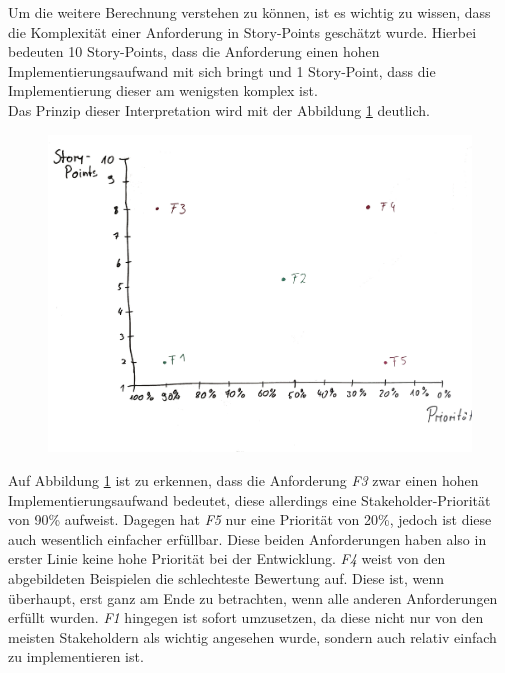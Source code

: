 Um die weitere Berechnung verstehen zu können, ist es wichtig zu wissen, dass die Komplexität einer Anforderung in Story-Points geschätzt wurde. Hierbei bedeuten 10 Story-Points, dass die Anforderung einen hohen Implementierungsaufwand mit sich bringt und 1 Story-Point, dass die Implementierung dieser am wenigsten komplex ist.\\

Das Prinzip dieser Interpretation wird mit der Abbildung \ref{fig:erklärung} deutlich.


\begin{figure}[!htb]
		\includegraphics[width=\textwidth]{images/ergebnis.pdf}
\centering 
{} 
  \label{fig:erklärung}
\end{figure}

Auf Abbildung \ref{fig:erklärung} ist zu erkennen, dass die Anforderung \textit{F3} zwar einen hohen Implementierungsaufwand bedeutet, diese allerdings eine Stakeholder-Priorität von 90\% aufweist. Dagegen hat \textit{F5} nur eine Priorität von 20\%, jedoch ist diese auch wesentlich einfacher erfüllbar. Diese beiden Anforderungen haben also in erster Linie keine hohe Priorität bei der Entwicklung. \textit{F4} weist von den abgebildeten Beispielen die schlechteste Bewertung auf. Diese ist, wenn überhaupt, erst ganz am Ende zu betrachten, wenn alle anderen Anforderungen erfüllt wurden. \textit{F1} hingegen ist sofort umzusetzen, da diese nicht nur von den meisten Stakeholdern als wichtig angesehen wurde, sondern auch relativ einfach zu implementieren ist. \\[1em]

